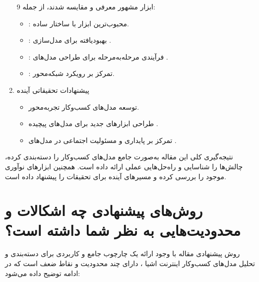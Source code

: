 \documentclass[10pt, twocolumn]{article}
\begin{document}
\begin{enumerate}
9 ابزار مشهور معرفی و مقایسه شدند، از جمله:  
\begin{itemize}
\item {}: محبوب‌ترین ابزار با ساختار ساده.  
\item {}: بهبودیافته برای مدل‌سازی .  
\item {}: فرآیندی مرحله‌به‌مرحله برای طراحی مدل‌های .  
\item {}: تمرکز بر رویکرد شبکه‌محور.  
\end{itemize}

\item 
پیشنهادات تحقیقاتی آینده  
\begin{itemize}
\item توسعه مدل‌های کسب‌وکار تجربه‌محور.  
\item طراحی ابزارهای جدید  برای مدل‌های پیچیده .  
\item تمرکز بر پایداری و مسئولیت اجتماعی در مدل‌های .
\end{itemize}  

\end{enumerate}

 نتیجه‌گیری کلی  
این مقاله به‌صورت جامع مدل‌های کسب‌وکار  را دسته‌بندی کرده، چالش‌ها را شناسایی و راه‌حل‌هایی عملی ارائه داده است. همچنین ابزارهای نوآوری موجود را بررسی کرده و مسیرهای آینده برای تحقیقات را پیشنهاد داده است.  

\section{روش‌های پیشنهادی چه اشکالات و محدودیت‌هایی به نظر شما داشته است؟}
روش پیشنهادی مقاله با وجود ارائه یک چارچوب جامع و کاربردی برای دسته‌بندی و تحلیل مدل‌های کسب‌وکار اینترنت اشیا ، دارای چند محدودیت و نقاط ضعف است که در ادامه توضیح داده می‌شود:  
\end{document}
